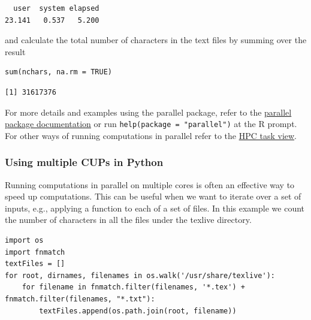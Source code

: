 \documentclass[11pt]{article}
\begin{document}
\begin{enumerate}
\begin{verbatim}
  user  system elapsed 
23.141   0.537   5.200
\end{verbatim}
and calculate the total number of characters in the text files by summing over the result
\begin{verbatim}
sum(nchars, na.rm = TRUE)
\end{verbatim}

\begin{verbatim}
[1] 31617376
\end{verbatim}

For more details and examples using the parallel package, refer to the \href{https://stat.ethz.ch/R-manual/R-devel/library/parallel/doc/parallel.pdf}{parallel package documentation} or run \texttt{help(package = "parallel")} at the R prompt. For other ways of running computations in parallel refer to the \href{http://cran.r-project.org/web/views/HighPerformanceComputing.html}{HPC task view}.
\end{enumerate}

\subsubsection{Using multiple CUPs in Python}
\label{sec:org40a8c0e}
Running computations in parallel on multiple cores is often an effective way to speed up computations. This can be useful when we want to iterate over a set of inputs, e.g., applying a function to each of a set of files. In this example we count the number of characters in all the files under the texlive directory. 

\begin{verbatim}
import os
import fnmatch
textFiles = []
for root, dirnames, filenames in os.walk('/usr/share/texlive'):
    for filename in fnmatch.filter(filenames, '*.tex') + fnmatch.filter(filenames, "*.txt"):
        textFiles.append(os.path.join(root, filename))
\end{verbatim}
\end{document}
